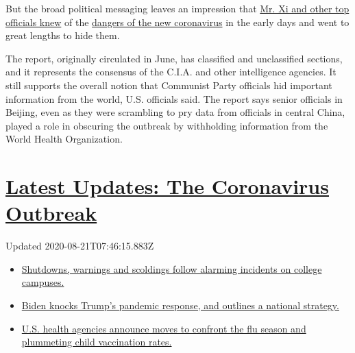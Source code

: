 But the broad political messaging leaves an impression that
\href{https://www.nytimes3xbfgragh.onion/2020/02/08/world/asia/xi-coronavirus-china.html}{Mr.
Xi and other top officials knew} of the
\href{https://www.nytimes3xbfgragh.onion/2020/04/18/health/coronavirus-america-future.html}{dangers
of the new coronavirus} in the early days and went to great lengths to
hide them.

The report, originally circulated in June, has classified and
unclassified sections, and it represents the consensus of the C.I.A. and
other intelligence agencies. It still supports the overall notion that
Communist Party officials hid important information from the world, U.S.
officials said. The report says senior officials in Beijing, even as
they were scrambling to pry data from officials in central China, played
a role in obscuring the outbreak by withholding information from the
World Health Organization.

\hypertarget{latest-updates-the-coronavirus-outbreak}{%
\section{\texorpdfstring{\href{https://www.nytimes3xbfgragh.onion/2020/08/20/world/coronavirus-covid.html?action=click\&pgtype=Article\&state=default\&region=MAIN_CONTENT_1\&context=storylines_live_updates}{Latest
Updates: The Coronavirus
Outbreak}}{Latest Updates: The Coronavirus Outbreak}}\label{latest-updates-the-coronavirus-outbreak}}

Updated 2020-08-21T07:46:15.883Z

\begin{itemize}
\tightlist
\item
  \href{https://www.nytimes3xbfgragh.onion/2020/08/20/world/coronavirus-covid.html?action=click\&pgtype=Article\&state=default\&region=MAIN_CONTENT_1\&context=storylines_live_updates\#link-68774d88}{Shutdowns,
  warnings and scoldings follow alarming incidents on college campuses.}
\item
  \href{https://www.nytimes3xbfgragh.onion/2020/08/20/world/coronavirus-covid.html?action=click\&pgtype=Article\&state=default\&region=MAIN_CONTENT_1\&context=storylines_live_updates\#link-26b58724}{Biden
  knocks Trump's pandemic response, and outlines a national strategy.}
\item
  \href{https://www.nytimes3xbfgragh.onion/2020/08/20/world/coronavirus-covid.html?action=click\&pgtype=Article\&state=default\&region=MAIN_CONTENT_1\&context=storylines_live_updates\#link-4e542da3}{U.S.
  health agencies announce moves to confront the flu season and
  plummeting child vaccination rates.}
\end{itemize}

